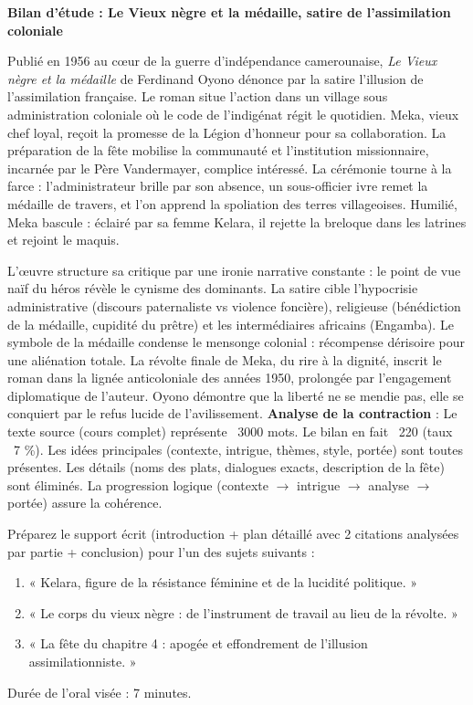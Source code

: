 \documentclass[11pt]{article}
\newcounter{popsec}
\newcounter{popsub}
\newcommand{\courssub}[1]{%
  \stepcounter{popsub}%
  \par\vspace{9pt}\noindent{\popxbold\fontsize{11.5}{13}\selectfont\color{popink}{\color{poporange}\thepopsec.\thepopsub}\hspace{6pt}#1}\par\nopagebreak\vspace{4pt}
}
\begin{document}
\begin{exoresolu}
\textbf{Bilan d'étude : Le Vieux nègre et la médaille, satire de l'assimilation coloniale}

Publié en 1956 au cœur de la guerre d'indépendance camerounaise, \emph{Le Vieux nègre et la médaille} de Ferdinand Oyono dénonce par la satire l'illusion de l'assimilation française. Le roman situe l'action dans un village sous administration coloniale où le code de l'indigénat régit le quotidien. Meka, vieux chef loyal, reçoit la promesse de la Légion d'honneur pour sa collaboration. La préparation de la fête mobilise la communauté et l'institution missionnaire, incarnée par le Père Vandermayer, complice intéressé. La cérémonie tourne à la farce : l'administrateur brille par son absence, un sous-officier ivre remet la médaille de travers, et l'on apprend la spoliation des terres villageoises. Humilié, Meka bascule : éclairé par sa femme Kelara, il rejette la breloque dans les latrines et rejoint le maquis.

L'œuvre structure sa critique par une ironie narrative constante : le point de vue naïf du héros révèle le cynisme des dominants. La satire cible l'hypocrisie administrative (discours paternaliste vs violence foncière), religieuse (bénédiction de la médaille, cupidité du prêtre) et les intermédiaires africains (Engamba). Le symbole de la médaille condense le mensonge colonial : récompense dérisoire pour une aliénation totale. La révolte finale de Meka, du rire à la dignité, inscrit le roman dans la lignée anticoloniale des années 1950, prolongée par l'engagement diplomatique de l'auteur. Oyono démontre que la liberté ne se mendie pas, elle se conquiert par le refus lucide de l'avilissement.
\tcblower
\textbf{Analyse de la contraction} : Le texte source (cours complet) représente ~3000 mots. Le bilan en fait ~220 (taux ~7 \%). Les idées principales (contexte, intrigue, thèmes, style, portée) sont toutes présentes. Les détails (noms des plats, dialogues exacts, description de la fête) sont éliminés. La progression logique (contexte $\to$ intrigue $\to$ analyse $\to$ portée) assure la cohérence.
\end{exoresolu}

\courssub{Exercices d'entraînement et remédiation}

\begin{exercice}
Préparez le support écrit (introduction + plan détaillé avec 2 citations analysées par partie + conclusion) pour l'un des sujets suivants :
\begin{enumerate}
    \item « Kelara, figure de la résistance féminine et de la lucidité politique. »
    \item « Le corps du vieux nègre : de l'instrument de travail au lieu de la révolte. »
    \item « La fête du chapitre 4 : apogée et effondrement de l'illusion assimilationniste. »
\end{enumerate}
Durée de l'oral visée : 7 minutes.
\end{exercice}
\end{document}
